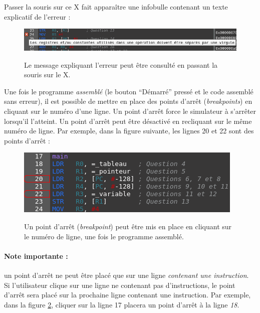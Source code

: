 \documentclass{tufte-handout}
\begin{document}
Passer la souris sur ce X fait apparaître une infobulle contenant un texte explicatif de l'erreur :
\begin{figure}[h!]
\raggedleft
\includegraphics[width=\linewidth]{pics/editeur_err_bulle.png}
\label{f:editeurerrorplus}
\caption{Le message expliquant l'erreur peut être consulté en passant la souris sur le X.}
\end{figure}

Une fois le programme \emph{assemblé} (le bouton ``Démarré'' pressé et le code assemblé sans erreur), il est possible de mettre en place des points d'arrêt (\textit{breakpoints}) en cliquant sur le numéro d'une ligne. Un point d'arrêt force le simulateur à s'arrêter lorsqu'il l'atteint. Un point d'arrêt peut être désactivé en recliquant sur le même numéro de ligne. Par exemple, dans la figure suivante, les lignes 20 et 22 sont des points d'arrêt :
\begin{figure}[h!]
\raggedleft
\includegraphics[width=0.9\linewidth]{pics/editeur_bkpt.png}
\label{f:editeurbkpt}
\caption{Un point d'arrêt (\textit{breakpoint}) peut être mis en place en cliquant sur le numéro de ligne, une fois le programme assemblé.}
\end{figure}

\paragraph{\textbf{Note importante :}}un point d'arrêt ne peut être placé que sur une ligne \emph{contenant une instruction}. Si l'utilisateur clique sur une ligne ne contenant pas d'instructions, le point d'arrêt sera placé sur la prochaine ligne contenant une instruction. Par exemple, dans la figure \ref{f:editeurbkpt}, cliquer sur la ligne 17 placera un point d'arrêt à la ligne \emph{18}.
\end{document}
